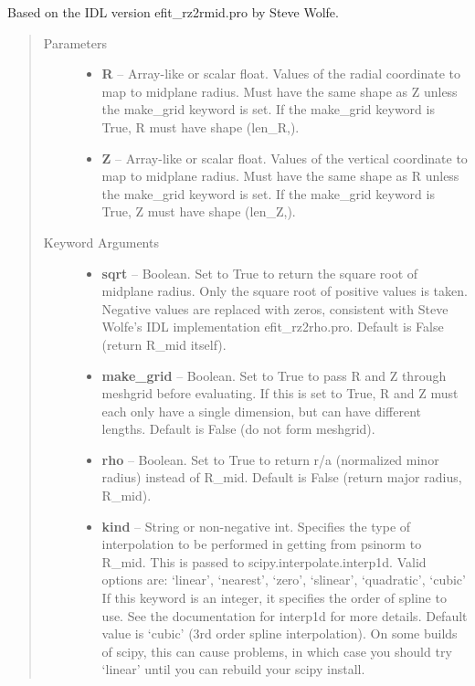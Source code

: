 \documentclass[letterpaper,10pt,english]{sphinxmanual}
\begin{document}
\begin{fulllineitems}
\begin{fulllineitems}
Based on the IDL version efit\_rz2rmid.pro by Steve Wolfe.
\begin{quote}\begin{description}
\item[{Parameters }] \leavevmode\begin{itemize}
\item {} 
\textbf{R} --
Array-like or scalar float.
Values of the radial coordinate to
map to midplane radius. Must have the same shape as Z unless
the make\_grid keyword is set. If the make\_grid keyword is True,
R must have shape (len\_R,).

\item {} 
\textbf{Z} --
Array-like or scalar float.
Values of the vertical coordinate to
map to midplane radius. Must have the same shape as R unless the
make\_grid keyword is set. If the make\_grid keyword is True, Z
must have shape (len\_Z,).

\end{itemize}

\item[{Keyword Arguments}] \leavevmode\begin{itemize}
\item {} 
\textbf{sqrt} --
Boolean.
Set to True to return the square root of midplane
radius. Only the square root of positive values is taken.
Negative values are replaced with zeros, consistent with Steve
Wolfe's IDL implementation efit\_rz2rho.pro. Default is False
(return R\_mid itself).

\item {} 
\textbf{make\_grid} --
Boolean.
Set to True to pass R and Z through meshgrid
before evaluating. If this is set to True, R and Z must each
only have a single dimension, but can have different lengths.
Default is False (do not form meshgrid).

\item {} 
\textbf{rho} --
Boolean.
Set to True to return r/a (normalized minor radius)
instead of R\_mid. Default is False (return major radius, R\_mid).

\item {} 
\textbf{kind} --
String or non-negative int.
Specifies the type of interpolation
to be performed in getting from psinorm to R\_mid. This is
passed to scipy.interpolate.interp1d. Valid options are:
`linear', `nearest', `zero', `slinear', `quadratic', `cubic'
If this keyword is an integer, it specifies the order of spline
to use. See the documentation for interp1d for more details.
Default value is `cubic' (3rd order spline interpolation). On
some builds of scipy, this can cause problems, in which case
you should try `linear' until you can rebuild your scipy install.


\end{itemize}
\end{description}
\end{quote}
\end{fulllineitems}
\end{fulllineitems}
\end{document}
